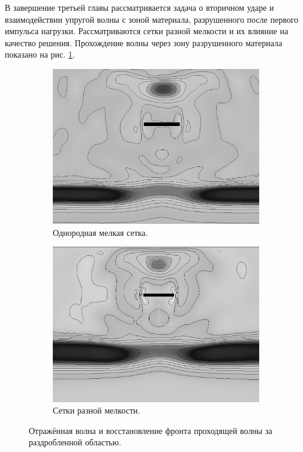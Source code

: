 В завершение третьей главы рассматривается задача о вторичном ударе и взаимодействии упругой волны с зоной материала, разрушенного после первого импульса нагрузки. Рассматриваются сетки разной мелкости и их влияние на качество решения. Прохождение волны через зону разрушенного материала показано на рис. \ref{pic:crack_final_front}.

\begin{figure}[htp]
\centering
\begin{subfigure}[b]{0.45\textwidth}
\centering
\includegraphics[width=\textwidth]{png/wave-around-crack/final-front-uniform-mesh.png}
\caption{Однородная мелкая сетка.}
\end{subfigure}
\begin{subfigure}[b]{0.45\textwidth}
\centering
\includegraphics[width=\textwidth]{png/wave-around-crack/final-front-non-uniform-mesh.png}
\caption{Сетки разной мелкости.}
\end{subfigure}
\caption{Отражённая волна и восстановление фронта проходящей волны за раздробленной областью.}
\label{pic:crack_final_front}
\end{figure}

